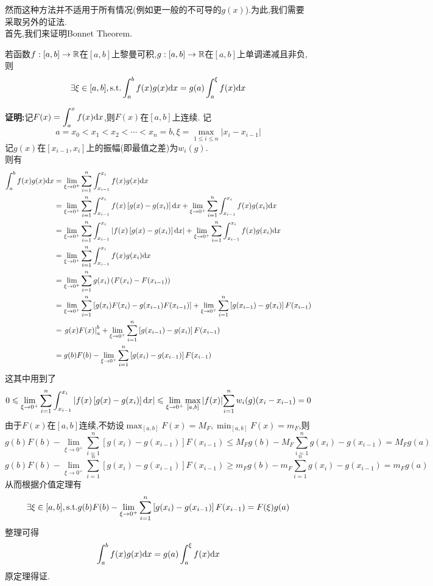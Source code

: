 \documentclass{ctexart}
\begin{document}
然而这种方法并不适用于所有情况(例如更一般的不可导的$g(x)$).为此,我们需要采取另外的证法.\\
首先,我们来证明Bonnet Theorem.
\begin{formal}
    若函数$f:[a,b]\to\mathbb{R}$在$[a,b]$上黎曼可积,$g:[a,b]\to\mathbb{R}$在$[a,b]$上单调递减且非负,则
    $$\exists\xi\in[a,b],\text{s.t.}\int_{a}^{b}{f(x)g(x)\mathrm{d} x}=g(a)\int_{a}^{\xi}{f(x)\mathrm{d} x}$$
\end{formal}
\begin{solution}[Proof.]
    \textbf{证明:}记$\displaystyle F(x)=\int_{a}^{x}{f(x)\mathrm{d} x}$,则$F(x)$在$[a,b]$上连续.
    记$$a=x_0<x_1<x_2<\cdots<x_n=b,\xi=\max_{1\leqslant i\leqslant n}{\left|x_i-x_{i-1}\right|}$$
    记$g(x)$在$[x_{i-1},x_i]$上的振幅(即最值之差)为$w_i(g)$.\\
    则有
    \begin{align*}
        \int_{a}^{b}{f(x)g(x)\mathrm{d} x}
        &= \lim_{\xi\to 0^+}{\sum_{i=1}^{n}{\int_{x_{i-1}}^{x_i}{f(x)g(x)\mathrm{d} x}}} \\
        &= \lim_{\xi\to 0^+}{\sum_{i=1}^{n}{\int_{x_{i-1}}^{x_i}{f(x)\left[g(x)-g(x_i)\right]\mathrm{d} x}}}+\lim_{\xi\to 0^+}{\sum_{i=1}^{n}{\int_{x_{i-1}}^{x_i}{f(x)g(x_i)\mathrm{d} x}}} \\
        &= \lim_{\xi\to 0^+}{\sum_{i=1}^{n}{\int_{x_{i-1}}^{x_i}{\left|f(x)\left[g(x)-g(x_i)\right]\mathrm{d} x\right|}}}+\lim_{\xi\to 0^+}{\sum_{i=1}^{n}{\int_{x_{i-1}}^{x_i}{f(x)g(x_i)\mathrm{d} x}}} \\
        &= \lim_{\xi\to 0^+}{\sum_{i=1}^{n}{\int_{x_{i-1}}^{x_i}{f(x)g(x_i)\mathrm{d} x}}} \\
        &= \lim_{\xi\to 0^+}{\sum_{i=1}^{n}{g(x_i)\left(F(x_i)-F(x_{i-1})\right)}} \\
        &= \lim_{\xi\to 0^+}{\sum_{i=1}^{n}\left[g(x_i)F(x_i)-g(x_{i-1})F(x_{i-1})\right]}+\lim_{\xi\to 0^+}{\sum_{i=1}^{n}\left[g(x_{i-1})-g(x_i)\right]F(x_{i-1})} \\
        &= \left.g(x)F(x)\right|_a^b+\lim_{\xi\to 0^+}{\sum_{i=1}^{n}\left[g(x_{i-1})-g(x_i)\right]F(x_{i-1})} \\
        &= g(b)F(b)-\lim_{\xi\to 0^+}{\sum_{i=1}^{n}\left[g(x_{i})-g(x_{i-1})\right]F(x_{i-1})}
    \end{align*}
    这其中用到了
    $$0\leqslant \lim_{\xi\to 0^+}{\sum_{i=1}^{n}{\int_{x_{i-1}}^{x_i}{\left|f(x)\left[g(x)-g(x_i)\right]\mathrm{d} x\right|}}}\leqslant \lim_{\xi\to 0^+}\max_{[a,b]}{\left|f(x)\right|}{\sum_{i=1}^{n}{w_i(g)(x_i-x_{i-1})}}=0$$
    由于$F(x)$在$[a,b]$连续,不妨设$\displaystyle\max_{[a,b]}F(x)=M_F,\min_{[a,b]}F(x)=m_F$,则
    $$g(b)F(b)-\lim_{\xi\to 0^+}{\sum_{i=1}^{n}\left[g(x_{i})-g(x_{i-1})\right]F(x_{i-1})}\leqslant M_Fg(b)-M_F\sum_{i=1}^{n}{g(x_i)-g(x_{i-1})}=M_Fg(a)$$
    $$g(b)F(b)-\lim_{\xi\to 0^+}{\sum_{i=1}^{n}\left[g(x_{i})-g(x_{i-1})\right]F(x_{i-1})}\geqslant m_Fg(b)-m_F\sum_{i=1}^{n}{g(x_i)-g(x_{i-1})}=m_Fg(a)$$
    从而根据介值定理有
    $$\displaystyle\exists\xi\in[a,b],\text{s.t.} g(b)F(b)-\lim_{\xi\to 0^+}{\sum_{i=1}^{n}\left[g(x_{i})-g(x_{i-1})\right]F(x_{i-1})}=F(\xi)g(a)$$
    整理可得$$\int_{a}^{b}{f(x)g(x)\mathrm{d} x}=g(a)\int_{a}^{\xi}{f(x)\mathrm{d} x}$$
    原定理得证.
\end{solution}\noindent
\end{document}
